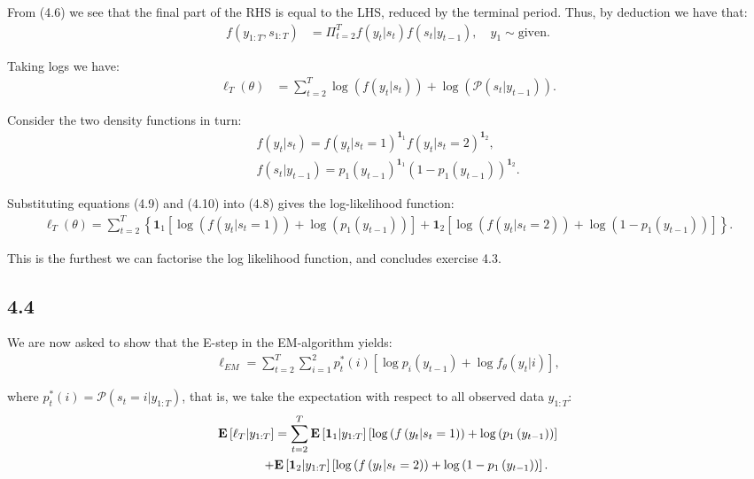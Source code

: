 \documentclass[11pt,a4paper,oneside]{article}
\newcommand{\lp}{\left(}
\newcommand{\rp}{\right)}
\newcommand{\rb}{\right]}
\newcommand{\lb}{\left[}
\newcommand{\lc}{\left\{}
\newcommand{\rc}{\right\}}
\newcommand{\ee}{\mathbf{E}}
\newcommand{\pp}{\mathcal{P}}
\newcommand{\ii}{\mathbf{1}}
\begin{document}
From (4.6) we see that the final part of the RHS is equal to the LHS, reduced by the terminal period. Thus, by deduction we have that:
\begin{align}
    f\lp y_{1:T}, s_{1:T}\rp 
        &= \Pi_{t = 2}^T f\lp y_t \vert s_t\rp f\lp s_t\vert y_{t-1}\rp, \quad y_1\sim \text{given}.
\end{align}

Taking logs we have:
\begin{align}
    \ell_T\lp \theta\rp 
        &= \sum_{t=2}^T \log\lp f\lp y_t \vert s_t\rp \rp  + \log \lp \pp \lp s_t\vert y_{t-1}\rp\rp.
\end{align}

Consider the two density functions in turn:
\begin{align}
    f\lp y_t \vert s_t\rp = f\lp y_t \vert s_t = 1\rp^{\ii_1} f\lp y_t \vert s_t = 2\rp^{\ii_2}, \\
    f\lp s_t \vert y_{t-1}\rp = p_1\lp y_{t-1}\rp^{\ii_1} \lp 1 - p_1\lp y_{t-1}\rp\rp^{\ii_2}.
\end{align}

Substituting equations (4.9) and (4.10) into (4.8) gives the log-likelihood function:
\begin{align}
    \ell_T\lp \theta\rp = \sum_{t=2}^T \lc \ii_1\lb \log \lp f\lp y_t \vert s_t = 1\rp \rp + \log \lp p_1\lp y_{t-1}\rp \rp \rb + \ii_2\lb \log\lp f\lp y_t \vert s_t = 2\rp \rp + \log \lp 1 - p_1\lp y_{t-1}\rp \rp \rb \rc.
\end{align}

This is the furthest we can factorise the log likelihood function, and concludes exercise 4.3.

\subsection{4.4}
We are now asked to show that the E-step in the EM-algorithm yields:
\begin{align}
    \ell_{EM} = \sum_{t=2}^T \sum_{i = 1}^2 p_t^* \lp i\rp \lb \log p_i \lp y_{t-1}\rp + \log f_\theta\lp y_t\vert i\rp \rb,
\end{align}

where $p_t^*\lp i\rp = \pp \lp s_t = i\vert y_{1:T}\rp$, that is, we take the expectation with respect to all observed data $y_{1:T}$:
\begin{align}
    \ee\lb \ell_T \vert y_{1:T}\rb 
        &= \sum_{t=2}^T 
            \ee\lb \ii_1\vert y_{1:T} \rb 
            \lb 
                \log \lp f\lp y_t \vert s_t = 1\rp \rp + \log \lp p_1\lp y_{t-1}\rp \rp
            \rb
            \notag \\
            +&
            \ee\lb \ii_2\vert y_{1:T} \rb 
            \lb
                \log\lp f\lp y_t \vert s_t = 2\rp \rp + \log \lp 1 - p_1\lp y_{t-1}\rp \rp 
            \rb.
\end{align}
\end{document}
